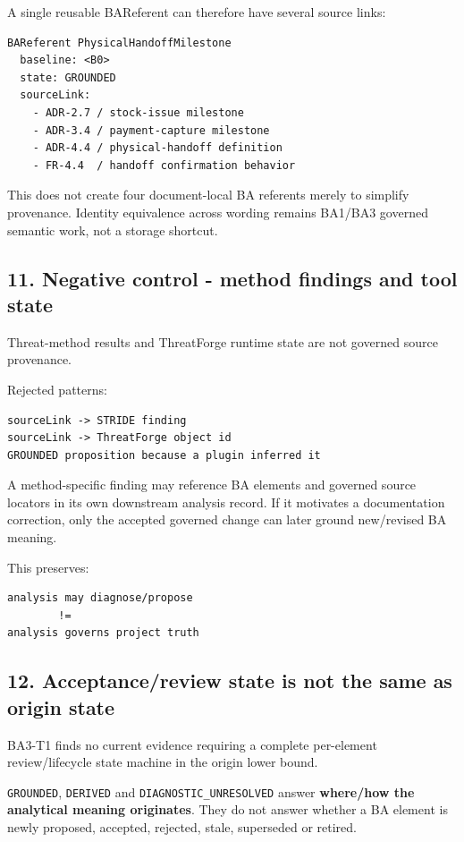 \documentclass[11pt,a4paper]{article}
\begin{document}
A single reusable BAReferent can therefore have several source links:

\begin{verbatim}
BAReferent PhysicalHandoffMilestone
  baseline: <B0>
  state: GROUNDED
  sourceLink:
    - ADR-2.7 / stock-issue milestone
    - ADR-3.4 / payment-capture milestone
    - ADR-4.4 / physical-handoff definition
    - FR-4.4  / handoff confirmation behavior
\end{verbatim}

This does not create four document-local BA referents merely to simplify provenance. Identity equivalence across wording remains BA1/BA3 governed semantic work, not a storage shortcut.

\subsection{11. Negative control - method findings and tool state}\label{11-negative-control---method-findings-and-tool-state}

Threat-method results and ThreatForge runtime state are not governed source provenance.

Rejected patterns:

\begin{verbatim}
sourceLink -> STRIDE finding
sourceLink -> ThreatForge object id
GROUNDED proposition because a plugin inferred it
\end{verbatim}

A method-specific finding may reference BA elements and governed source locators in its own downstream analysis record. If it motivates a documentation correction, only the accepted governed change can later ground new/revised BA meaning.

This preserves:

\begin{verbatim}
analysis may diagnose/propose
        !=
analysis governs project truth
\end{verbatim}

\subsection{12. Acceptance/review state is not the same as origin state}\label{12-acceptancereview-state-is-not-the-same-as-origin-state}

BA3-T1 finds no current evidence requiring a complete per-element review/lifecycle state machine in the origin lower bound.

\texttt{GROUNDED}, \texttt{DERIVED} and \texttt{DIAGNOSTIC\_UNRESOLVED} answer \textbf{where/how the analytical meaning originates}. They do not answer whether a BA element is newly proposed, accepted, rejected, stale, superseded or retired.
\end{document}
